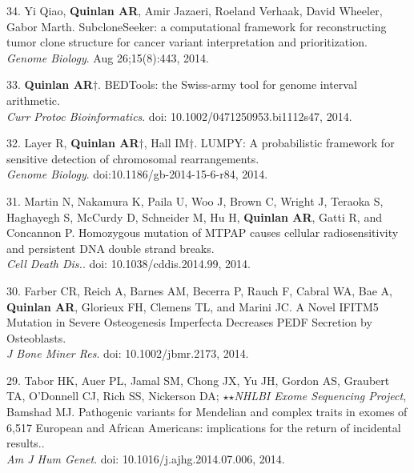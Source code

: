 \documentclass[margin,line]{cv}
\begin{document}
\begin{resume}
\begin{list}{*}{}
    \item[34.] Yi Qiao, \textbf{Quinlan AR}, Amir Jazaeri, Roeland Verhaak, David Wheeler, Gabor Marth.
    SubcloneSeeker: a computational framework for reconstructing tumor clone structure for cancer variant interpretation and prioritization.\\
    \emph{Genome Biology}. Aug 26;15(8):443, 2014.

    \item[33.] \textbf{Quinlan AR}$\dagger$.
    BEDTools: the Swiss-army tool for genome interval arithmetic.\\
    \emph{Curr Protoc Bioinformatics}. doi: 10.1002/0471250953.bi1112s47, 2014.

    \item[32.] Layer R, \textbf{Quinlan AR}$\dagger$, Hall IM$\dagger$.
    LUMPY: A probabilistic framework for sensitive detection of chromosomal rearrangements.\\
    \emph{Genome Biology}. doi:10.1186/gb-2014-15-6-r84, 2014.

    \item[31.] Martin N, Nakamura K, Paila U, Woo J, Brown C, Wright J, Teraoka S, Haghayegh S, McCurdy D, Schneider M, Hu H, \textbf{Quinlan AR}, Gatti R, and Concannon P.
    Homozygous mutation of MTPAP causes cellular radiosensitivity and persistent DNA double strand breaks.\\
    \emph{Cell Death Dis.}. doi: 10.1038/cddis.2014.99, 2014.

    \item[30.] Farber CR, Reich A, Barnes AM, Becerra P, Rauch F, Cabral WA, Bae A, \textbf{Quinlan AR}, Glorieux FH, Clemens TL, and Marini JC.
    A Novel IFITM5 Mutation in Severe Osteogenesis Imperfecta Decreases PEDF Secretion by Osteoblasts.\\
    \emph{J Bone Miner Res}. doi: 10.1002/jbmr.2173, 2014.

    \item[29.] Tabor HK, Auer PL, Jamal SM, Chong JX, Yu JH, Gordon AS, Graubert TA, O'Donnell CJ, Rich SS, Nickerson DA; $\star$$\star$\textit{NHLBI Exome Sequencing Project}, Bamshad MJ.
    Pathogenic variants for Mendelian and complex traits in exomes of 6,517 European and African Americans: implications for the return of incidental results..\\
    \emph{Am J Hum Genet}. doi: 10.1016/j.ajhg.2014.07.006, 2014.


\end{list}
\end{resume}
\end{document}
